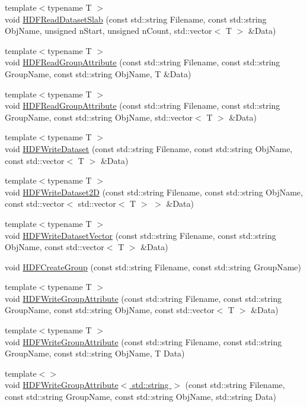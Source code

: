 \begin{DoxyCompactItemize}
\item 
{\footnotesize template$<$typename T $>$ }\\void \hyperlink{HDFIO__new_8h_ac10c67494671661d5466ff2258154c8a}{HDFReadDatasetSlab} (const std::string Filename, const std::string ObjName, unsigned nStart, unsigned nCount, std::vector$<$ T $>$ \&Data)
\item 
{\footnotesize template$<$typename T $>$ }\\void \hyperlink{HDFIO__new_8h_ab2ce05626da8d9a7d059795c4d5f02cc}{HDFReadGroupAttribute} (const std::string Filename, const std::string GroupName, const std::string ObjName, T \&Data)
\item 
{\footnotesize template$<$typename T $>$ }\\void \hyperlink{HDFIO__new_8h_aa73c5851b1f8ae24364803f9578b1d8f}{HDFReadGroupAttribute} (const std::string Filename, const std::string GroupName, const std::string ObjName, std::vector$<$ T $>$ \&Data)
\item 
{\footnotesize template$<$typename T $>$ }\\void \hyperlink{HDFIO__new_8h_aa73a8d13c03b62b0a709d7e7248f0ca7}{HDFWriteDataset} (const std::string Filename, const std::string ObjName, const std::vector$<$ T $>$ \&Data)
\item 
{\footnotesize template$<$typename T $>$ }\\void \hyperlink{HDFIO__new_8h_a913817631ba066e8204abbacb6eb6b9f}{HDFWriteDataset2D} (const std::string Filename, const std::string ObjName, const std::vector$<$ std::vector$<$ T $>$ $>$ \&Data)
\item 
{\footnotesize template$<$typename T $>$ }\\void \hyperlink{HDFIO__new_8h_a2beb19611043d3393a282ae7a2810075}{HDFWriteDatasetVector} (const std::string Filename, const std::string ObjName, const std::vector$<$ T $>$ \&Data)
\item 
void \hyperlink{HDFIO__new_8h_adfafd5685316cd050ad282b7837e7f05}{HDFCreateGroup} (const std::string Filename, const std::string GroupName)
\item 
{\footnotesize template$<$typename T $>$ }\\void \hyperlink{HDFIO__new_8h_a93cc34de059a978c3b65e4a2fdd8bbc8}{HDFWriteGroupAttribute} (const std::string Filename, const std::string GroupName, const std::string ObjName, const std::vector$<$ T $>$ \&Data)
\item 
{\footnotesize template$<$typename T $>$ }\\void \hyperlink{HDFIO__new_8h_a63d06b2c68f083f2a15b63f95b228a9b}{HDFWriteGroupAttribute} (const std::string Filename, const std::string GroupName, const std::string ObjName, T Data)
\item 
{\footnotesize template$<$$>$ }\\void \hyperlink{HDFIO__new_8h_a1e82999f4bd8497304ff6571d9566781}{HDFWriteGroupAttribute$<$ std::string $>$} (const std::string Filename, const std::string GroupName, const std::string ObjName, std::string Data)
\end{DoxyCompactItemize}


